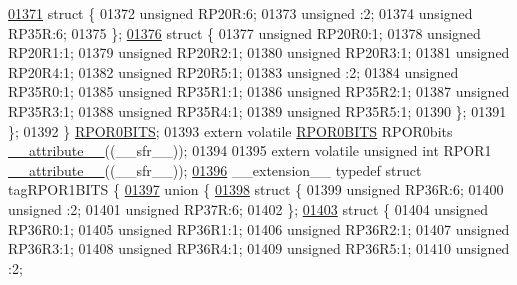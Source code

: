 \begin{DoxyCode}
\hypertarget{a00009_source_l01371}{}\hyperlink{a00009}{01371}     \textcolor{keyword}{struct }\{
01372       \textcolor{keywordtype}{unsigned} RP20R:6;
01373       \textcolor{keywordtype}{unsigned} :2;
01374       \textcolor{keywordtype}{unsigned} RP35R:6;
01375     \};
\hypertarget{a00009_source_l01376}{}\hyperlink{a00009}{01376}     \textcolor{keyword}{struct }\{
01377       \textcolor{keywordtype}{unsigned} RP20R0:1;
01378       \textcolor{keywordtype}{unsigned} RP20R1:1;
01379       \textcolor{keywordtype}{unsigned} RP20R2:1;
01380       \textcolor{keywordtype}{unsigned} RP20R3:1;
01381       \textcolor{keywordtype}{unsigned} RP20R4:1;
01382       \textcolor{keywordtype}{unsigned} RP20R5:1;
01383       \textcolor{keywordtype}{unsigned} :2;
01384       \textcolor{keywordtype}{unsigned} RP35R0:1;
01385       \textcolor{keywordtype}{unsigned} RP35R1:1;
01386       \textcolor{keywordtype}{unsigned} RP35R2:1;
01387       \textcolor{keywordtype}{unsigned} RP35R3:1;
01388       \textcolor{keywordtype}{unsigned} RP35R4:1;
01389       \textcolor{keywordtype}{unsigned} RP35R5:1;
01390     \};
01391   \};
01392 \} \hyperlink{a00008_da/df7/a00739}{RPOR0BITS};
01393 \textcolor{keyword}{extern} \textcolor{keyword}{volatile} \hyperlink{a00008_da/df7/a00739}{RPOR0BITS} RPOR0bits \hyperlink{a00009_a493c46f03454991ccc5aa7a6e1dfb2a7}{\_\_attribute\_\_}((\_\_sfr\_\_));
01394 
01395 \textcolor{keyword}{extern} \textcolor{keyword}{volatile} \textcolor{keywordtype}{unsigned} \textcolor{keywordtype}{int}  RPOR1 \hyperlink{a00009_a493c46f03454991ccc5aa7a6e1dfb2a7}{\_\_attribute\_\_}((\_\_sfr\_\_));
\hypertarget{a00009_source_l01396}{}\hyperlink{a00008}{01396} \_\_extension\_\_ \textcolor{keyword}{typedef} \textcolor{keyword}{struct }tagRPOR1BITS \{
\hypertarget{a00009_source_l01397}{}\hyperlink{a00009}{01397}   \textcolor{keyword}{union }\{
\hypertarget{a00009_source_l01398}{}\hyperlink{a00009}{01398}     \textcolor{keyword}{struct }\{
01399       \textcolor{keywordtype}{unsigned} RP36R:6;
01400       \textcolor{keywordtype}{unsigned} :2;
01401       \textcolor{keywordtype}{unsigned} RP37R:6;
01402     \};
\hypertarget{a00009_source_l01403}{}\hyperlink{a00009}{01403}     \textcolor{keyword}{struct }\{
01404       \textcolor{keywordtype}{unsigned} RP36R0:1;
01405       \textcolor{keywordtype}{unsigned} RP36R1:1;
01406       \textcolor{keywordtype}{unsigned} RP36R2:1;
01407       \textcolor{keywordtype}{unsigned} RP36R3:1;
01408       \textcolor{keywordtype}{unsigned} RP36R4:1;
01409       \textcolor{keywordtype}{unsigned} RP36R5:1;
01410       \textcolor{keywordtype}{unsigned} :2;

\end{DoxyCode}
